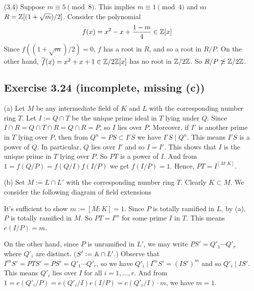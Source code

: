 \documentclass[../Marcus.tex]{subfiles}
\begin{document}
(3.4) Suppose $m\equiv 5\pmod{8}$. This implies $m\equiv 1\pmod{4}$ and so $R=\ZZ[{(1+\sqrt{m})/2}]$. Consider the polynomial $$f(x)=x^2-x+\frac{1-m}{4}\in\ZZ[x]$$ Since $f((1+\sqrt{m})/2)=0$, $f$ has a root in $R$, and so a root in $R/P$. On the other hand, $\ovl{f}(x)=x^2+x+1\in\ZZ/2\ZZ[x]$ has no root in $\ZZ/2\ZZ$. So $R/P\not\simeq\ZZ/2\ZZ$.

\subsection*{Exercise 3.24 \color{red}(incomplete, missing (c))}

(a) Let $M$ be any intermediate field of $K$ and $L$ with the corresponding number ring $T$. Let $I:=Q\cap T$ be the unique prime ideal in $T$ lying under $Q$. Since $I\cap R=Q\cap T\cap R=Q\cap R=P$, so $I$ lies over $P$. Moreover, if $I'$ is another prime in $T$ lying over $P$, then from $Q^n=PS\subset I'S$ we have $I'S\mid Q^n$. This means $I'S$ is a power of $Q$. In particular, $Q$ lies over $I'$ and so $I=I'$. This shows that $I$ is the unique prime in $T$ lying over $P$. So $PT$ is a power of $I$. And from $1=f(Q/P)=f(Q/I)f(I/P)$ we get $f(I/P)=1$. Hence, $PT=I^{[M:K]}$.

(b) Set $M:=L\cap L'$ with the corresponding number ring $T$. Clearly $K\subset M$. We consider the following diagram of field extensions
\begin{center}
\end{center}
It's sufficient to show $m:=[M:K]=1$. Since $P$ is totally ramified in $L$, by (a), $P$ is totally ramified in $M$. So $PT=I^m$ for some prime $I$ in $T$. This means $e(I/P)=m$.

On the other hand, since $P$ is unramified in $L'$, we may write $PS'=Q'_1\cdots Q'_r$ where $Q'_i$ are distinct. ($S':=\AA\cap L'$.) Observe that $I^mS'=PTS'=PS'=Q'_1\cdots Q'_r$, so we have $Q'_i \mid I^m S' = (IS')^m$ and so $Q'_i \mid IS'$. This means $Q'_i$ lies over $I$ for all $i=1,\ldots,r$. And from $1=e(Q'_i/P)=e(Q'_i/I)e(I/P)=e(Q'_i/I)\cdot m$, we have $m=1$.

\end{document}

